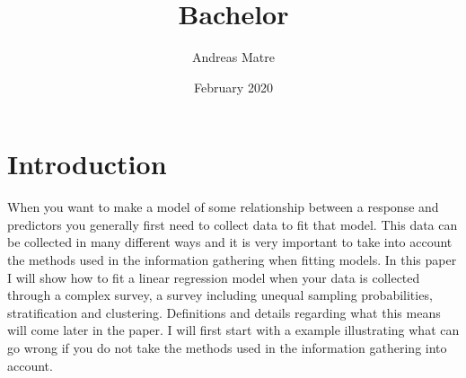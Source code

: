 \documentclass{article}
\title{Bachelor}
\author{Andreas Matre}
\date{February 2020}
\begin{document}
\newtheorem{definition}{Definition}[subsection]
\newtheorem{theorem}{Theorem}
\newtheorem{example}{Example}[section]


\maketitle

\tableofcontents

\section{Introduction}

When you want to make a model of some relationship between a response and predictors you generally first need to collect data to fit that model. This data can be collected in many different ways and it is very important to take into account the methods used in the information gathering when fitting models. In this paper I will show how to fit a linear regression model when your data is collected through a complex survey, a survey including unequal sampling probabilities, stratification and clustering. Definitions and details regarding what this means will come later in the paper. I will first start with a example illustrating what can go wrong if you do not take the methods used in the information gathering into account.
\end{document}
